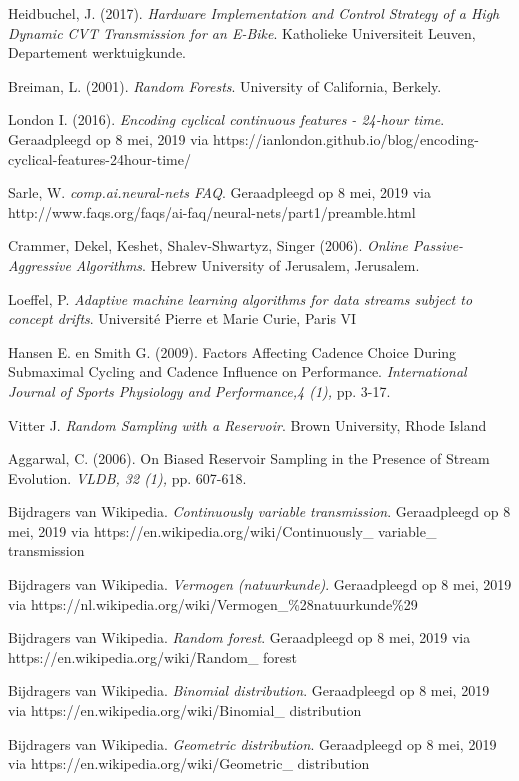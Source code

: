 \begin{thebibliography}{9}
Heidbuchel, J. (2017).
\textit{Hardware Implementation and Control Strategy of a High Dynamic CVT Transmission for an E-Bike}.
Katholieke Universiteit Leuven,
Departement werktuigkunde.
 
Breiman, L. (2001).
\textit{Random Forests}.
University of California, Berkely.

London I. (2016).
\textit{Encoding cyclical continuous features - 24-hour time}. Geraadpleegd op 8 mei, 2019 via https://ianlondon.github.io/blog/encoding-cyclical-features-24hour-time/

Sarle, W. 
\textit{comp.ai.neural-nets FAQ}.
Geraadpleegd op 8 mei, 2019 via http://www.faqs.org/faqs/ai-faq/neural-nets/part1/preamble.html

Crammer, Dekel, Keshet, Shalev-Shwartyz, Singer (2006).
\textit{Online Passive-Aggressive Algorithms}.
Hebrew University of Jerusalem, Jerusalem.

Loeffel, P. 
\textit{Adaptive machine learning algorithms for data streams subject to concept drifts}. 
Université Pierre et Marie Curie, Paris VI

Hansen E. en Smith G. (2009).
Factors Affecting Cadence Choice During Submaximal Cycling and Cadence Influence on Performance.
\textit{International Journal of Sports Physiology and Performance,4 (1), }pp. 3-17.

Vitter J. 
\textit{Random Sampling with a Reservoir}. 
Brown University, Rhode Island

Aggarwal, C. (2006).
On Biased Reservoir Sampling in the Presence of Stream Evolution.
\textit{VLDB, 32 (1), }pp. 607-618.

Bijdragers van Wikipedia.
\textit{Continuously variable transmission}.
Geraadpleegd op 8 mei, 2019 via https://en.wikipedia.org/wiki/Continuously\_ variable\_ transmission

Bijdragers van Wikipedia.
\textit{Vermogen (natuurkunde)}.
Geraadpleegd op 8 mei, 2019 via https://nl.wikipedia.org/wiki/Vermogen\_\%28natuurkunde\%29

Bijdragers van Wikipedia.
\textit{Random forest}.
Geraadpleegd op 8 mei, 2019 via https://en.wikipedia.org/wiki/Random\_ forest

Bijdragers van Wikipedia.
\textit{Binomial distribution}.
Geraadpleegd op 8 mei, 2019 via https://en.wikipedia.org/wiki/Binomial\_ distribution

Bijdragers van Wikipedia.
\textit{Geometric distribution}.
Geraadpleegd op 8 mei, 2019 via https://en.wikipedia.org/wiki/Geometric\_ distribution

\end{thebibliography}
